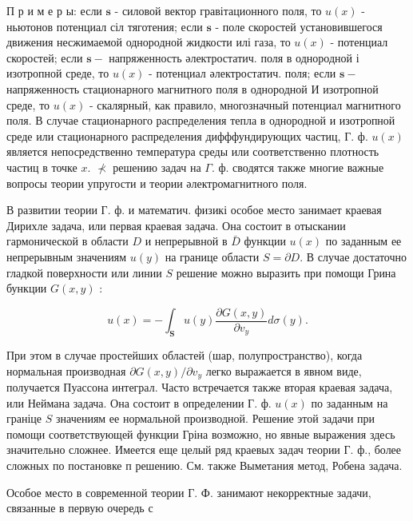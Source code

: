 \documentclass[10pt]{article}
\begin{document}
П р и м е р ы: если $\boldsymbol{s}$ - силовой вектор гравітационного поля, то $u(x)$ - ньютонов потенциал сіл тяготения; если $\boldsymbol{s}$ - поле скоростей установившегося движения несжимаемой однородной жидкости илі газа, то $u(x)$ - потенциал скоростей; если $\boldsymbol{s}-$ напряженность әлектростатич. поля в однородной і изотропной среде, то $u(x)$ - потенциал әлектростатич. поля; если $\boldsymbol{s}-$ напряженность стационарного магнитного поля в однородной И изотропной среде, то $u(x)$ - скалярный, как правило, многозначный потенциал магнитного поля. В случае стационарного распределения тепла в однородной и изотропной среде или стационарного распределения дифффундирующих частиц, Г. ф. $u(x)$ является непосредственно температура среды или соответственно плотность частиц в точке $x$. $\nprec$ решению задач на $\Gamma$. ф. сводятся также многие важные вопросы теории упругости и теории әлектромагнитного поля.



В развитии теории Г. ф. и математич. физикі особое место занимает краевая Дирихле задача, или первая краевая задача. Она состоит в отыскании гармонической в области $D$ и непрерывной в $\bar{D}$ функции $u(x)$ по заданным ее непрерывным значениям $u(y)$ на границе области $S=\partial D$. В случае достаточно гладкой поверхности или линии $S$ решение можно выразить при помощи Грина бункции $G(x, y)$ :



\[

u(x)=-\int_{\boldsymbol{S}} u(y) \frac{\partial G(x, y)}{\partial v_{y}} d \sigma(y) .

\]



При этом в случае простейших областей (шар, полупространство), когда нормальная производная $\partial G(x, y) / \partial v_{y}$ легко выражается в явном виде, получается Пуассона интеграл. Часто встречается также вторая краевая задача, или Неймана задача. Она состоит в определении Г. ф. $u(x)$ по заданным на граніце $S$ значениям ее нормальной производной. Решение этой задачи при помощи соответствующей функции Гріна возможно, но явные выражения здесь значительно сложнее. Имеется еще целый ряд краевых задач теории Г. ф., более сложных по постановке п решению. См. также Выметания метод, Робена задача.



Особое место в современной теории Г. Ф. занимают некорректные задачи, связанные в первую очередь с
\end{document}

